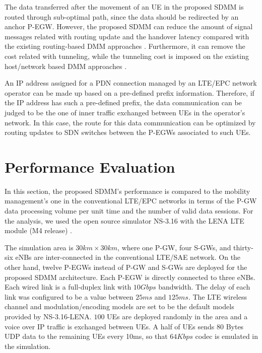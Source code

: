 \documentclass[runningheads,a4paper]{llncs}
\begin{document}
The data transferred after the movement of an UE in the proposed SDMM is routed through sub-optimal path, since the data should be redirected by an anchor P-EGW. However, the proposed SDMM can reduce the amount of signal messages related with routing update and the handover latency compared with the existing routing-based DMM approaches \cite{ref11,ref12}. Furthermore, it can remove the cost related with tunneling, while the tunneling cost is imposed on the existing host/network based DMM approaches \cite{!!!}.

An IP address assigned for a PDN connection managed by an LTE/EPC network operator can be made up based on a pre-defined prefix information. Therefore, if the IP address has such a pre-defined prefix, the data communication can be judged to be the one of inner traffic exchanged between UEs in the operator's network. In this case, the route for this data communication can be optimized by routing updates to SDN switches between the P-EGWs associated to such UEs.


\section{Performance Evaluation}

In this section, the proposed SDMM's performance is compared to the mobility management's one in the conventional LTE/EPC networks in terms of the P-GW data processing volume per unit time and the number of valid data sessions. For the analysis, we used the open source simulator NS-3.16 \cite{ref13} with the LENA LTE module (M4 release) \cite{ref13-1}.

The simulation area is $30 km \times 30 km$, where one P-GW, four S-GWs, and thirty-six eNBs are inter-connected in the conventional LTE/SAE network. On the other hand, twelve P-EGWs instead of P-GW and S-GWs are deployed for the proposed SDMM architecture. Each P-EGW is directly connected to three eNBs. Each wired link is a full-duplex link with $10 Gbps$ bandwidth. The delay of each link was configured to be a value between $25 ms$ and $125 ms$. The LTE wireless channel and modulation/encoding models are set to be the default models provided by NS-3.16-LENA. $100$ UEs are deployed randomly in the area and a voice over IP traffic is exchanged between UEs. A half of UEs sends 80 Bytes UDP data to the remaining UEs every 10ms, so that $64 Kbps$ codec is emulated in the simulation.
\end{document}
